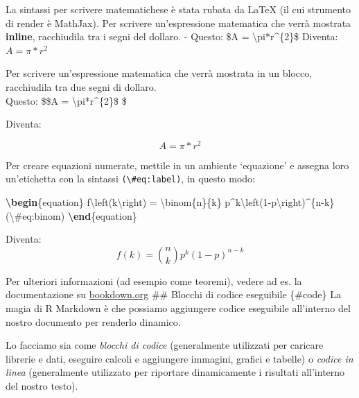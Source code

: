 \documentclass[a4paper, 11pt, nobind]{templates/ociamthesis}
\newenvironment{Shaded}{\begin{snugshade}}{\end{snugshade}}
\newcommand{\ExtensionTok}[1]{#1}
\newcommand{\KeywordTok}[1]{\textcolor[rgb]{0.13,0.29,0.53}{\textbf{#1}}}
\newcommand{\NormalTok}[1]{#1}
\newcommand{\SpecialCharTok}[1]{\textcolor[rgb]{0.00,0.00,0.00}{#1}}
\newcommand{\SpecialStringTok}[1]{\textcolor[rgb]{0.31,0.60,0.02}{#1}}
\renewenvironment{Shaded}
{
  \vspace{10pt}%
  \begin{snugshade}%
}{%
  \end{snugshade}%
  \vspace{8pt}%
}
\begin{document}
La sintassi per scrivere matematichese è stata rubata da LaTeX (il cui strumento di render è MathJax). Per scrivere un'espressione matematica che verrà mostrata \textbf{inline}, racchiudila tra i segni del dollaro.
- Questo: \$A = \textbackslash pi*r\^{}\{2\}\$ Diventa: \(A = \pi*r^{2}\)

Per scrivere un'espressione matematica che verrà mostrata in un blocco, racchiudila tra due segni di dollaro.\\

Questo: \$\$A = \textbackslash pi*r\^{}\{2\}\$ \$

Diventa:

\[A = \pi*r^{2}\]

Per creare equazioni numerate, mettile in un ambiente `equazione' e assegna loro un'etichetta con la sintassi \texttt{(\textbackslash{}\#eq:label)}, in questo modo:

\begin{Shaded}
\begin{Highlighting}[]
\KeywordTok{\textbackslash{}begin}\NormalTok{\{}\ExtensionTok{equation}\NormalTok{\}}\SpecialStringTok{ }
\SpecialStringTok{  f}\SpecialCharTok{\textbackslash{}left}\SpecialStringTok{(k}\SpecialCharTok{\textbackslash{}right}\SpecialStringTok{) = }\SpecialCharTok{\textbackslash{}binom}\SpecialStringTok{\{n\}\{k\} p\^{}k}\SpecialCharTok{\textbackslash{}left}\SpecialStringTok{(1{-}p}\SpecialCharTok{\textbackslash{}right}\SpecialStringTok{)\^{}\{n{-}k\}}
\SpecialStringTok{  (}\SpecialCharTok{\textbackslash{}\#}\SpecialStringTok{eq:binom)}
\KeywordTok{\textbackslash{}end}\NormalTok{\{}\ExtensionTok{equation}\NormalTok{\} }
\end{Highlighting}
\end{Shaded}

Diventa:
\begin{equation}
f\left(k\right)=\binom{n}{k}p^k\left(1-p\right)^{n-k}
\label{eq:binom}
\end{equation}

Per ulteriori informazioni (ad esempio come teoremi), vedere ad es. la documentazione su \href{https://bookdown.org/yihui/bookdown/markdown-extensions-by-bookdown.html\#equations}{bookdown.org}
\#\# Blocchi di codice eseguibile \{\#code\}
La magia di R Markdown è che possiamo aggiungere codice eseguibile all'interno del nostro documento per renderlo dinamico.

Lo facciamo sia come \emph{blocchi di codice} (generalmente utilizzati per caricare librerie e dati, eseguire calcoli e aggiungere immagini, grafici e tabelle) o \emph{codice in linea} (generalmente utilizzato per riportare dinamicamente i risultati all'interno del nostro testo).
\end{document}
